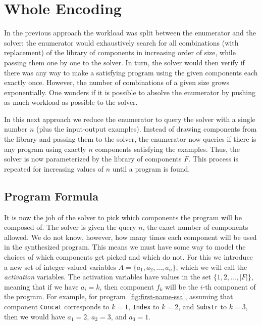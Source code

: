 \section{Whole Encoding}
\label{sec:whole-encoding}

In the previous approach the workload was split between the enumerator and the
solver: the enumerator would exhaustively search for all combinations (with
replacement) of the library of components in increasing order of size, while
passing them one by one to the solver. In turn, the solver would then verify if
there was any way to make a satisfying program using the given components each
exactly once. However, the number of combinations of a given size grows
exponentially. One wonders if it is possible to absolve the enumerator by
pushing as much workload as possible to the solver.

In this next approach we reduce the enumerator to query the solver with a single
number $n$ (plus the input-output examples). Instead of drawing components from the
library and passing them to the solver, the enumerator now queries if there is 
any program using exactly $n$ components satisfying the examples. Thus, the
solver is now parameterized by the library of components $F$. This process is
repeated for increasing values of $n$ until a program is found.

\subsection{Program Formula}
\label{sec:program-formula-whole}

It is now the job of the solver to pick which components the program will be
composed of. The solver is given the query $n$, the exact number of components
allowed. We do not know, however, how many times each component will be used in
the synthesized program. This means we must have some way to model the choices
of which components get picked and which do not. For this we introduce a new set
of integer-valued variables $A = \{a_1, a_2, ..., a_n\}$, which we will call the
\textit{activation} variables. The activation variables have values in the set
$\{1, 2, ..., |F|\}$, meaning that if we have $a_i = k$, then component $f_k$
will be the $i$-th component of the program. For example, for
program~\ref{fig:first-name-ssa}, assuming that component \lstinline{Concat}
corresponds to $k = 1$, \lstinline{Index} to $k = 2$, and \lstinline{Substr} to
$k = 3$, then we would have $a_1 = 2 $, $a_2 = 3$, and $a_3 = 1$.

